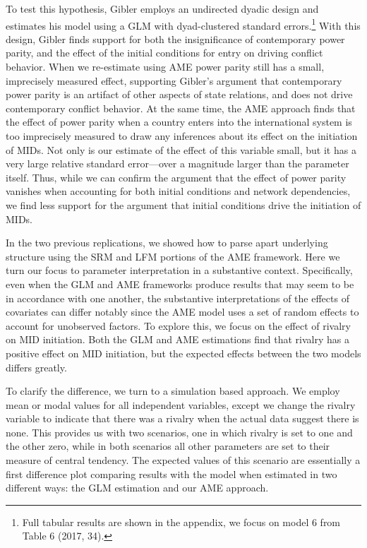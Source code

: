 To test this hypothesis, Gibler employs an undirected dyadic design and estimates his model using a GLM with dyad-clustered standard errors.\footnote{Full tabular results are shown in the appendix, we focus on model 6 from Table 6 (2017, 34).} With this design, Gibler finds support for both the insignificance of contemporary power parity, and the effect of the initial conditions for entry on driving conflict behavior. When we re-estimate using AME power parity still has a small, imprecisely measured effect, supporting Gibler's argument that contemporary power parity is an artifact of other aspects of state relations, and does not drive contemporary conflict behavior. At the same time, the AME approach finds that the effect of power parity when a country enters into the international system is too imprecisely measured to draw any inferences about its effect on the initiation of MIDs. Not only is our estimate of the effect of this variable small, but it has a very large relative standard error---over a magnitude larger than the parameter itself. Thus, while we can confirm the argument that the effect of power parity vanishes when accounting for both initial conditions and network dependencies, we find less support for the argument that initial conditions drive the initiation of MIDs.

In the two previous replications, we showed how to parse apart underlying structure using the SRM and LFM portions of the AME framework. Here we turn our focus to parameter interpretation in a substantive context. Specifically, even when the GLM and AME frameworks produce results that may seem to be in accordance with one another, the substantive interpretations of the effects of covariates can differ notably since the AME model uses a set of random effects to account for unobserved factors. To explore this, we focus on the effect of rivalry on MID initiation. Both the GLM and AME estimations find that rivalry has a positive effect on MID initiation, but the expected effects between the two models differs greatly.

To clarify the difference, we turn to a simulation based approach. We employ mean or modal values for all independent variables, except we change the rivalry variable to indicate that there was a rivalry when the actual data suggest there is none. This provides us with two scenarios, one in which rivalry is set to one and the other zero, while in both scenarios all other parameters are set to their measure of central tendency. The expected values of this scenario are essentially a first difference plot comparing results with the model when estimated in two different ways: the GLM estimation and our AME approach.

